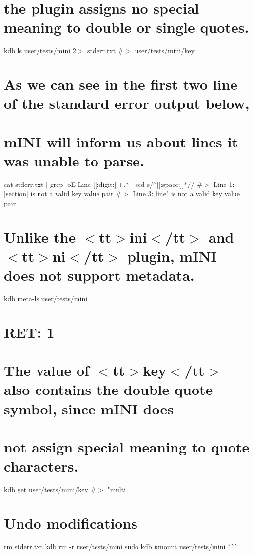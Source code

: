 \hypertarget{autotoc_md402_autotoc_md421}{}\section{the plugin assigns no special meaning to double or single quotes.}\label{autotoc_md402_autotoc_md421}
kdb ls user/tests/mini 2$>$ stderr.\+txt \#$>$ user/tests/mini/key\hypertarget{autotoc_md402_autotoc_md422}{}\section{As we can see in the first two line of the standard error output below,}\label{autotoc_md402_autotoc_md422}
\hypertarget{autotoc_md402_autotoc_md423}{}\section{m\+I\+N\+I will inform us about lines it was unable to parse.}\label{autotoc_md402_autotoc_md423}
cat stderr.\+txt $\vert$ grep -\/oE \textquotesingle{}Line \mbox{[}\mbox{[}\+:digit\+:\mbox{]}\mbox{]}+.$\ast$\textquotesingle{} $\vert$ sed \textquotesingle{}s/$^\wedge$\mbox{[}\mbox{[}\+:space\+:\mbox{]}\mbox{]}$\ast$//\textquotesingle{} \#$>$ Line 1\+: \textquotesingle{}\mbox{[}section\mbox{]}\textquotesingle{} is not a valid key value pair \#$>$ Line 3\+: \textquotesingle{}line"\textquotesingle{} is not a valid key value pair\hypertarget{autotoc_md402_autotoc_md424}{}\section{Unlike the $<$tt$>$ini$<$/tt$>$ and $<$tt$>$ni$<$/tt$>$ plugin, m\+I\+N\+I does not support metadata.}\label{autotoc_md402_autotoc_md424}
kdb meta-\/ls user/tests/mini \hypertarget{autotoc_md402_autotoc_md425}{}\section{R\+E\+T\+: 1}\label{autotoc_md402_autotoc_md425}
\hypertarget{autotoc_md402_autotoc_md426}{}\section{The value of $<$tt$>$key$<$/tt$>$ also contains the double quote symbol, since m\+I\+N\+I does}\label{autotoc_md402_autotoc_md426}
\hypertarget{autotoc_md402_autotoc_md427}{}\section{not assign special meaning to quote characters.}\label{autotoc_md402_autotoc_md427}
kdb get user/tests/mini/key \#$>$ "multi\hypertarget{autotoc_md402_autotoc_md428}{}\section{Undo modifications}\label{autotoc_md402_autotoc_md428}
rm stderr.\+txt kdb rm -\/r user/tests/mini sudo kdb umount user/tests/mini \`{}\`{}\`{} 